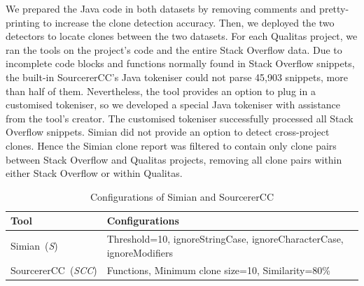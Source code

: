 \documentclass[10pt,journal,compsoc]{IEEEtran}
\begin{document}
We prepared the Java code in both datasets by removing comments and
pretty-printing to increase the clone detection accuracy. Then, we deployed the
two detectors to locate clones between the two datasets.  For each Qualitas
project, we ran the tools on the project's code and the entire Stack Overflow
data. Due to incomplete code blocks and functions
normally found in Stack Overflow snippets, the built-in SourcererCC's Java
tokeniser could not parse 45,903 snippets, more than half of them. Nevertheless,
the tool provides an option to plug in a customised tokeniser, so we developed a
special Java tokeniser with assistance from the tool's creator. The customised
tokeniser successfully processed all Stack Overflow snippets.
Simian did not provide an option to detect cross-project clones. Hence the
Simian clone report was filtered to contain only clone pairs between Stack
Overflow and Qualitas projects, removing all clone pairs within either Stack
Overflow or within Qualitas. 

\begin{table}
	\centering
	\caption{Configurations of Simian and SourcererCC}
	\label{t:param_tuning}
	\begin{tabular}{lp{5cm}}
		\toprule
		Tool & Configurations \\
		\midrule
		Simian~(\textit{S}) &  Threshold=10, ignoreStringCase, \newline ignoreCharacterCase, \newline ignoreModifiers \\ 
		\midrule
		SourcererCC~(\textit{SCC}) & Functions, Minimum clone size=10, \newline Similarity=80\% \\
		\bottomrule
	\end{tabular} %
\end{table}
\end{document}
